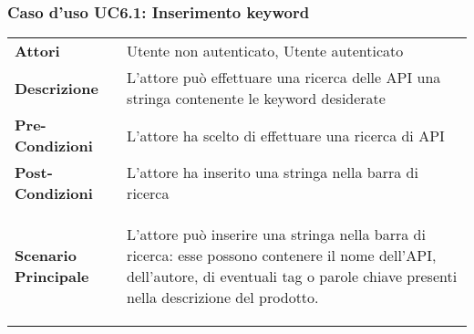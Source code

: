 \subsubsection{Caso d'uso UC6.1: Inserimento keyword}
\label{UC6_1}

\begin{minipage}{\linewidth}
\begin{tabular}{ l | p{11cm}}
	\hline
	\rowcolor{Gray}
	 \multicolumn{2}{c}{UC6.1 - Inserimento keyword} \\
	 \hline
	\textbf{Attori} & Utente non autenticato, Utente autenticato \\
	\textbf{Descrizione} & L'attore può effettuare una ricerca delle API una stringa contenente le keyword desiderate\\
	\textbf{Pre-Condizioni} & L'attore ha scelto di effettuare una ricerca di API\\
	\textbf{Post-Condizioni} & L'attore ha inserito una stringa nella barra di ricerca \\
	\textbf{Scenario Principale} & 
	\begin{enumerate*}[label=(\arabic*.),itemjoin={\newline}]
		\item L'attore può inserire una stringa nella barra di ricerca: esse possono contenere il nome dell'API, dell'autore, di eventuali tag o parole chiave presenti nella descrizione del prodotto.
	\end{enumerate*}\\
\end{tabular}
\end{minipage}